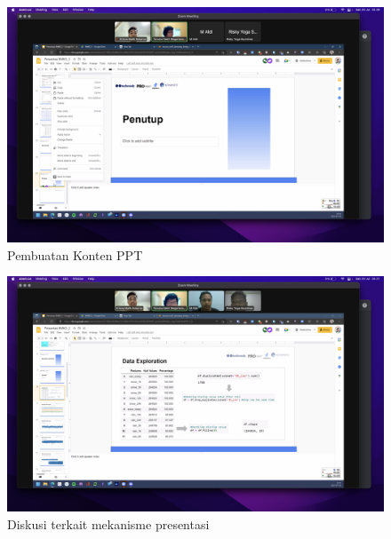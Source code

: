 \documentclass[12pt, a4paper]{article}
\begin{document}
\begin{figure}[h]
    \centering
    \includegraphics[width=\textwidth]{pert-3.1}
    \caption{Pembuatan Konten PPT}
\end{figure}

\begin{figure}[h]
    \centering
    \includegraphics[width=\textwidth]{pert-3.2}
    \caption{Diskusi terkait mekanisme presentasi}
\end{figure}
\end{document}
